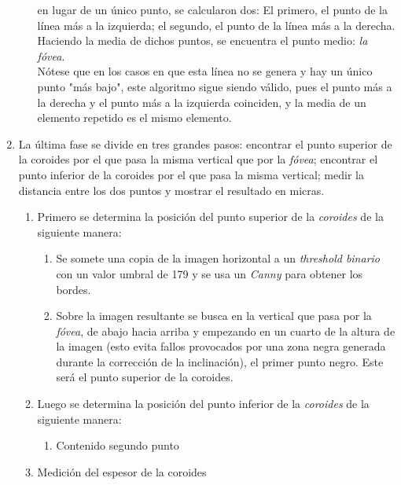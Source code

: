 \begin{enumerate}
\begin{enumerate}[label*=\arabic*.]
    en lugar de un único punto, se calcularon dos: El primero, el punto 
    de la línea más a la izquierda; el segundo, el punto de la línea más 
    a la derecha. Haciendo la media de dichos puntos, se encuentra el 
    punto medio: \emph{la fóvea}. \\
    Nótese que en los casos en que esta línea no se genera y hay un único 
    punto "más bajo", este algoritmo sigue siendo válido, pues el punto 
    más a la derecha y el punto más a la izquierda coinciden, y la media 
    de un elemento repetido es el mismo elemento.
  \end{enumerate}
\item La última fase se divide en tres grandes pasos: encontrar el
  punto superior de la coroides por el que pasa la misma vertical
  que por la \emph{fóvea}; encontrar el punto inferior de la coroides
  por el que pasa la misma vertical; medir la distancia entre los dos
  puntos y mostrar el resultado en micras.
  \begin{enumerate}[label*=\arabic*.]
  \item Primero se determina la posición del punto superior de la
    \emph{coroides} de la siguiente manera:
    \begin{enumerate}[label*=\arabic*.]
    \item Se somete una copia de la imagen horizontal a un 
      \emph{threshold binario} con un valor umbral de 179 y se usa un
      \emph{Canny} para obtener los bordes. 
    \item Sobre la imagen resultante se busca en la vertical que pasa 
      por la \emph{fóvea}, de abajo hacia arriba y empezando en un 
      cuarto de la altura de la imagen (esto evita fallos provocados 
      por una zona negra generada durante la corrección de la inclinación), 
      el primer punto negro. Este será el punto superior de la coroides.
    \end{enumerate}
  \item Luego se determina la posición del punto inferior de la
    \emph{coroides} de la siguiente manera:
    \begin{enumerate}[label*=\arabic*.]
    \item Contenido segundo punto
    \end{enumerate}
  \item Medición del espesor de la coroides
  \end{enumerate}
\end{enumerate}